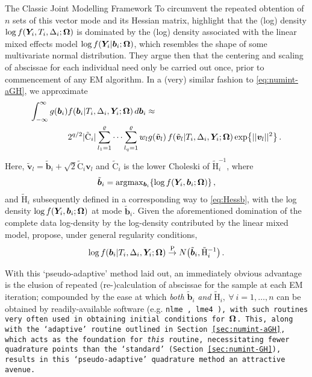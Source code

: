 \begin{chapter}{\label{cha:methods-classic}The Classic Joint Modelling Framework}
To circumvent the repeated obtention of $n$ sets of this vector mode and its Hessian matrix, \citet{Rizopoulos2012} highlight that the (log) density $\log f\!\left(\bm{Y}_i,T_i,\Delta_i;\bm{\mathrm{\Omega}}\right)$ is dominated by the (log) density associated with the linear mixed effects model $\log f\!\left(\bm{Y}_i|\bm{b}_i;\bm{\mathrm{\Omega}}\right)$, which resembles the shape of some multivariate normal distribution. They argue then that the centering and scaling of abscissae for each individual need only be carried out once, prior to commencement of any EM algorithm. In a (very) similar fashion to \eqref{eq:numint-aGH}, we approximate
\begin{align}
    \int_{-\infty}^\infty g\!\left(\bm{b}_i\right) &f\!\left(\bm{b}_i|T_i,\Delta_i,\bm{Y}_i;\bm{\mathrm{\Omega}}\right) d\bm{b}_i \approx \nonumber\\
    & 2^{q/2}|\tilde{\mathrm{C}}_i|\sum_{l_1=1}^\varrho\dots\sum_{l_q=1}^\varrho w_l g\!\left( \tilde{\bm{v}}_l\right) f\!\left( \tilde{\bm{v}}_l|T_i,\Delta_i,\bm{Y}_i;\bm{\mathrm{\Omega}}\right)\exp\!\left\{||\bm{v}_l||^2\right\}.
\label{eq:numint-paGH}
\end{align}
Here, $\tilde{\bm{v}}_l=\tilde{\bm{b}}_i+\sqrt{2}\tilde{\mathrm{C}}_i\bm{v}_l$ and $\tilde{\mathrm{C}}_i$ is the lower Choleski of $\tilde{\mathrm{H}}_i^{-1}$, where
\begin{align}
    \tilde{\bm{b}}_i=\arg\!\max{}\!_{\bm{b}_i}\!\left\{\log f\!\left(\bm{Y}_i, \bm{b}_i;\bm{\mathrm{\Omega}}\right)\right\}, 
\label{eq:pargmaxb}
\end{align}
and $\tilde{\mathrm{H}}_i$ subsequently defined in a corresponding way to \eqref{eq:Hessb}, with the log density $\log f\!\left(\bm{Y}_i,\bm{b}_i;\bm{\mathrm{\Omega}}\right)$ at mode $\tilde{\bm{b}}_i$. Given the aforementioned domination of the complete data log-density by the log-density contributed by the linear mixed model, \citet{Rizopoulos2012} propose, under general regularity conditions,
\begin{equation}
    \log f\!\left(\bm{b}_i|T_i,\Delta_i,\bm{Y}_i;\bm{\mathrm{\Omega}}\right)\overset{\mathrm{P}}{\rightarrow}N\!\left(\tilde{\bm{b}}_i,\tilde{\mathrm{H}}_i^{-1}\right).
\label{eq:rizappx}
\end{equation}

With this `pseudo-adaptive' method laid out, an immediately obvious advantage is the elusion of repeated (re-)calculation of abscissae for the sample at each EM iteration; compounded by the ease at which \textit{both} $\tilde{\bm{b}}_i$ \textit{and} $\tilde{\mathrm{H}}_i,\ \forall\ i=1,\dots,n$ can be obtained by readily-available software (e.g. \tt{nlme} \citep{R-nlme}, \tt{lme4} \citep{R-lme4}), with such routines very often used in obtaining initial conditions for $\bm{\mathrm{\Omega}}$. This, along with the `adaptive' routine outlined in Section \ref{sec:numint-aGH}, which acts as the foundation for \textit{this} routine, necessitating fewer quadrature points than the `standard' (Section \ref{sec:numint-GH}), results in this `pseudo-adaptive' quadrature method an attractive avenue. 


\end{chapter}
